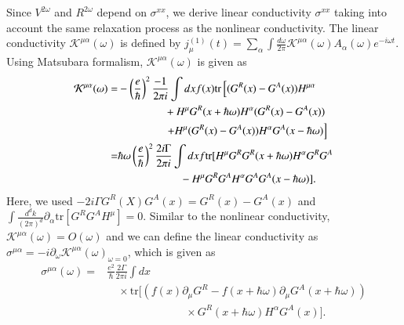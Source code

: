 \documentclass[twocolumn,superscriptaddress]{revtex4-1}
\begin{document}
Since $V^{2\omega}$ and $R^{2\omega}$ depend on $\sigma^{xx}$, we derive linear conductivity $\sigma^{xx}$ taking into account the same relaxation process as the nonlinear conductivity.
The linear conductivity $\mathcal{K}^{\mu\alpha}(\omega)$ is defined by $j_\mu^{(1)}(t)=\sum_\alpha \int \frac{d\omega}{2\pi } \mathcal{K}^{\mu\alpha} (\omega) A_\alpha (\omega) e^{-i\omega t}$.
Using Matsubara formalism, $\mathcal{K}^{\mu\alpha}(\omega)$ is given as
\begin{align}
    \mathcal{K}^{\mu\alpha}(\omega)=&-\left(\frac{e}{\hbar}\right)^2\frac{-1}{2\pi i}\int dx f(x) \mathrm{tr}\left[(G^R(x)-G^A(x))H^{\mu\alpha}\right. \nonumber \\
    &\hspace{1.5cm}+H^\mu G^R(x+\hbar\omega)H^\alpha (G^R(x)-G^A(x)) \nonumber \\
    &\hspace{1.5cm}\left. +H^\mu (G^R(x)-G^A(x)) H^\alpha G^A(x-\hbar\omega) \right]\nonumber \\
    =&\hbar\omega\left(\frac{e}{\hbar}\right)^2\frac{2i\Gamma}{2\pi i}\int dx f \mathrm{tr}[H^\mu G^{R}G^R(x+\hbar\omega)H^\alpha  G^R G^A \nonumber \\
    &\hspace{2cm}- H^\mu  G^R G^A H^\alpha G^{A}G^A(x-\hbar\omega)] .
\end{align}
Here, we used $-2i\Gamma G^R(X) G^A(x) =G^R(x)-G^A(x)$ and $\int \frac{d^d k}{(2\pi)^d}\partial_\alpha \mathrm{tr}[G^R G^A H^{\mu}]=0$.
Similar to the nonlinear conductivity, $\mathcal{K}^{\mu\alpha}(\omega)=O(\omega)$ and we can define the linear conductivity as $\sigma^{\mu\alpha}=-i\partial_\omega \mathcal{K}^{\mu\alpha}(\omega)_{\omega=0}$, which is given as
\begin{align}
  \sigma^{\mu\alpha}(\omega)
  =& \frac{e^2}{\hbar}\frac{2\Gamma}{2\pi i}\int dx \nonumber \\
  &\quad \times \mathrm{tr}[(f(x)\partial_\mu G^R -f(x+\hbar\omega)\partial_\mu G^A(x+\hbar\omega))\nonumber \\
  &\hspace{3cm} \times G^R(x+\hbar\omega)H^\alpha G^A(x)].
\end{align}
\end{document}
